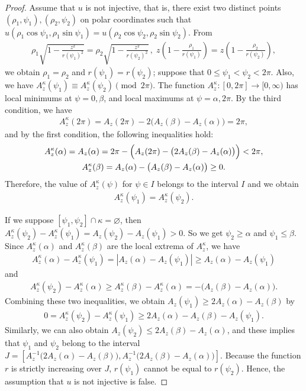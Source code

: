 \documentclass{amsart}
\theoremstyle{plain}
\theoremstyle{definition}
\theoremstyle{remark}
\begin{document}
\begin{proof}%
Assume that $u$ is not injective, that is, there exist two distinct points $(\rho_1,\psi_1),(\rho_2,\psi_2)$ on polar coordinates such that $u(\rho_1\cos\psi_1,\rho_1\sin\psi_1)=u(\rho_2\cos\psi_2,\rho_2\sin\psi_2)$.
From
\begin{align*}
\rho_1\sqrt{1-\frac{z^2}{r(\psi_1)^2}}=\rho_2\sqrt{1-\frac{z^2}{r(\psi_2)^2}}\,,\;
z\left(1-\frac{\rho_1}{r(\psi_1)}\right)=z\left(1-\frac{\rho_2}{r(\psi_2)}\right),
\end{align*}
we obtain $\rho_1=\rho_2$ and $r(\psi_1)=r(\psi_2)$; suppose that $0\le\psi_1<\psi_2<2\pi$.
Also, we have $A_z^{\kappa}(\psi_1)\equiv A_z^{\kappa}(\psi_2)\pmod{2\pi}$.
The function $A_z^{\kappa}:[0,2\pi]\to[0,\infty)$ has local minimums at $\psi=0,\beta$, and local maximums at $\psi=\alpha,2\pi$.
By the third condition, we have
\begin{align*}
A_z^{\kappa}(2\pi)=A_z(2\pi)-2\bigl(A_z(\beta)-A_z(\alpha)\bigr)=2\pi,
\end{align*}
and by the first condition, the following inequalities hold:
\begin{gather*}
A_z^{\kappa}(\alpha)=A_z(\alpha)=2\pi-\Bigl(A_z(2\pi)-\bigl(2A_z(\beta)-A_z(\alpha)\bigr)\Bigr)<2\pi,\\
A_z^{\kappa}(\beta)=A_z(\alpha)-\bigl(A_z(\beta)-A_z(\alpha)\bigr)\ge0.
\end{gather*}
Therefore, the value of $A_z^{\kappa}(\psi)$ for $\psi\in I$ belongs to the interval $I$ and we obtain
\begin{align*}
A_z^{\kappa}(\psi_1)=A_z^{\kappa}(\psi_2).
\end{align*}

If we suppose $[\psi_1,\psi_2]\cap\kappa=\varnothing$, then $A_z^{\kappa}(\psi_2)-A_z^{\kappa}(\psi_1)=A_z(\psi_2)-A_z(\psi_1)>0$.
So we get $\psi_2\ge\alpha$ and $\psi_1\le\beta$.
Since $A_z^{\kappa}(\alpha)$ and $A_z^{\kappa}(\beta)$ are the local extrema of $A_z^{\kappa}$, we have
\begin{align*}
A_z^{\kappa}(\alpha)-A_z^{\kappa}(\psi_1)=|A_z(\alpha)-A_z(\psi_1)|\ge A_z(\alpha)-A_z(\psi_1)
\end{align*}
and
\begin{align*}
A_z^{\kappa}(\psi_2)-A_z^{\kappa}(\alpha)\ge A_z^{\kappa}(\beta)-A_z^{\kappa}(\alpha)=-\bigl(A_z(\beta)-A_z(\alpha)\bigr).
\end{align*}
Combining these two inequalities, we obtain $A_z(\psi_1)\ge 2A_z(\alpha)-A_z(\beta)$ by
\begin{align*}
0=A_z^{\kappa}(\psi_2)-A_z^{\kappa}(\psi_1)\ge2A_z(\alpha)-A_z(\beta)-A_z(\psi_1).
\end{align*}
Similarly, we can also obtain $A_z(\psi_2)\le2A_z(\beta)-A_z(\alpha)$, and these implies that $\psi_1$ and $\psi_2$ belong to the interval $J=[A_z^{-1}\bigl(2A_z(\alpha)-A_z(\beta)\bigr),A_z^{-1}\bigl(2A_z(\beta)-A_z(\alpha)\bigr)]$.
Because the function $r$ is strictly increasing over $J$, $r(\psi_1)$ cannot be equal to $r(\psi_2)$.
Hence, the assumption that $u$ is not injective is false.
\end{proof}
\end{document}
